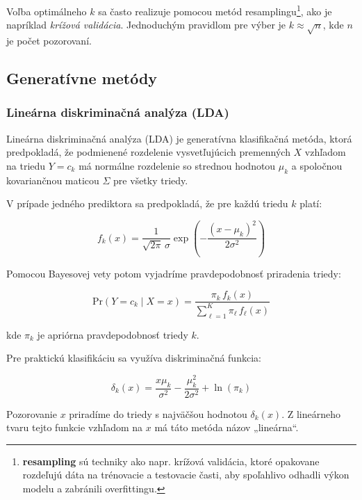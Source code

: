 Voľba optimálneho $k$ sa často realizuje pomocou metód resamplingu\footnote{\textbf{resampling} sú techniky ako napr. krížová validácia, ktoré opakovane rozdeľujú dáta na trénovacie a testovacie časti, aby spoľahlivo odhadli výkon modelu a zabránili overfittingu.}, ako je napríklad \textit{krížová validácia}. Jednoduchým pravidlom pre výber je $k \approx \sqrt{n}$, kde $n$ je počet pozorovaní.



\subsection{Generatívne metódy}
\label{subsec:gener_methods}

\subsubsection{Lineárna diskriminačná analýza (LDA)}
\label{subsubsec:lda}

Lineárna diskriminačná analýza (LDA) je generatívna klasifikačná metóda, ktorá predpokladá, že podmienené rozdelenie vysvetľujúcich premenných $X$ vzhľadom na triedu $Y = c_k$ má normálne rozdelenie so strednou hodnotou $\mu_k$ a spoločnou kovariančnou maticou $\Sigma$ pre všetky triedy.

V prípade jedného prediktora sa predpokladá, že pre každú triedu $k$ platí:

\begin{equation}
f_k(x) = \frac{1}{\sqrt{2\pi} \, \sigma} \exp\left( -\frac{(x - \mu_k)^2}{2\sigma^2} \right)
\end{equation}

Pomocou Bayesovej vety potom vyjadríme pravdepodobnosť priradenia triedy:

\begin{equation}
\mathrm{Pr}(Y = c_k \mid X = x) = \frac{\pi_k \, f_k(x)}{\sum\limits_{\ell = 1}^{K} \pi_\ell \, f_\ell(x)}
\end{equation}

kde $\pi_k$ je apriórna pravdepodobnosť triedy $k$.

Pre praktickú klasifikáciu sa využíva diskriminačná funkcia:

\begin{equation}
\delta_k(x) = \frac{x \mu_k}{\sigma^2} - \frac{\mu_k^2}{2\sigma^2} + \ln(\pi_k)
\end{equation}

Pozorovanie $x$ priradíme do triedy s najväčšou hodnotou $\delta_k(x)$. Z lineárneho tvaru tejto funkcie vzhľadom na $x$ má táto metóda názov „lineárna“.

